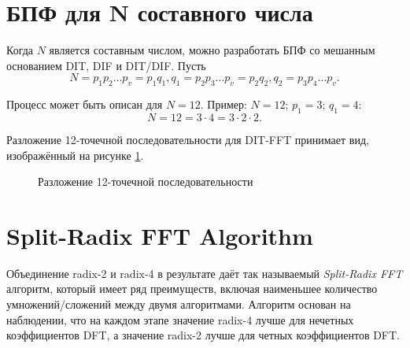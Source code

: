 \section{БПФ для N составного числа}
Когда $N$ является составным числом, можно разработать БПФ со мешанным основанием DIT, DIF и DIT/DIF. Пусть
\begin{equation}\label{eq: N decomposition}
N = p_1 p_2 \dots p_v = p_1 q_1, q_1 = p_2 p_3 \dots p_v = p_2 q_2, q_2 = p_3 p_4 \dots p_v.
\end{equation}

Процесс может быть описан для $N = 12$. Пример: $N = 12$; $p_1 = 3$; $q_1 = 4$:
\begin{equation}\label{eq: N decomposition example}
N = 12 = 3 \cdot 4 = 3 \cdot 2 \cdot 2.
\end{equation}

Разложение 12-точечной последовательности для DIT-FFT принимает вид, изображённый на рисунке \ref{figure: 12 point decomposition}.
\begin{figure}[ht]
\centering
\caption{Разложение 12-точечной последовательности}
\label{figure: 12 point decomposition}
\end{figure}

\section{Split-Radix FFT Algorithm}
Объединение radix-2 и radix-4 в результате даёт так называемый \textit{Split-Radix FFT} алгоритм, который имеет ряд преимуществ, включая наименьшее количество умножений/сложений между двумя алгоритмами. Алгоритм основан на наблюдении, что на каждом этапе значение radix-4 лучше для нечетных коэффициентов DFT, а значение radix-2 лучше для четных коэффициентов DFT.

